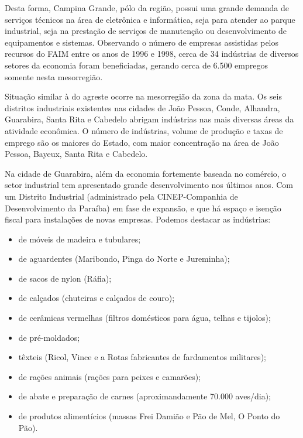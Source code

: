 Desta forma, Campina Grande, pólo da região, possui uma grande demanda de serviços técnicos na área de eletrônica e informática, seja para atender ao parque industrial, seja na prestação de serviços de manutenção ou desenvolvimento de equipamentos e sistemas. Observando o número de empresas assistidas pelos recursos do FAIM entre os anos de 1996 e 1998, cerca de 34 indústrias de diversos setores da economia foram beneficiadas, gerando cerca de 6.500 empregos somente nesta mesorregião.


Situação similar à do agreste ocorre na mesorregião da zona da mata. Os seis distritos industriais existentes nas cidades de João Pessoa, Conde, Alhandra, Guarabira, Santa Rita e Cabedelo abrigam indústrias nas mais diversas áreas da atividade econômica. O número de indústrias, volume de produção e taxas de emprego são os maiores do Estado, com maior concentração na área de João Pessoa, Bayeux, Santa Rita e Cabedelo.

Na cidade de Guarabira, além da economia fortemente baseada no comércio, o setor industrial tem apresentado grande desenvolvimento nos últimos anos. Com um Distrito Industrial (administrado pela CINEP-Companhia de Desenvolvimento da Paraíba) em fase de expansão, e que há espaço e isenção fiscal para instalações de novas empresas. Podemos destacar as indústrias:

\begin{itemize}
  \item de móveis de madeira e tubulares;
  \item de aguardentes (Maribondo, Pinga do Norte e Jureminha);
  \item de sacos de nylon (Ráfia);
  \item de calçados (chuteiras e calçados de couro);
  \item de cerâmicas vermelhas (filtros domésticos para água, telhas e tijolos);
  \item de pré-moldados;
  \item têxteis (Ricol, Vince e a Rotas fabricantes de fardamentos militares);
  \item de rações animais (rações para peixes e camarões);
  \item de abate e preparação de carnes (aproximandamente 70.000 aves/dia);
  \item de produtos alimentícios (massas Frei Damião e Pão de Mel, O Ponto do Pão).
\end{itemize}


